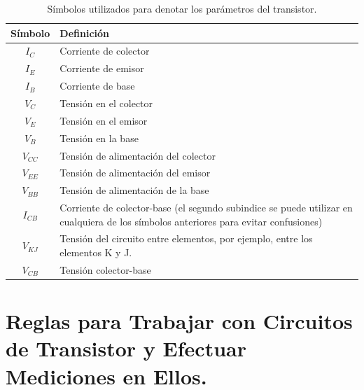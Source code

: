 \documentclass[a4paper,12pt]{article}
\begin{document}
\begin{table}[H]
    \centering
    \begin{tabular}{cp{12cm}}
        \toprule
        Símbolo      & Definición                                                                    \\
        \midrule
        \( I_C \)    & Corriente de colector                                                         \\
        \( I_E \)    & Corriente de emisor                                                           \\
        \( I_B \)    & Corriente de base                                                             \\
        \( V_C \)    & Tensión en el colector                                                        \\
        \( V_E \)    & Tensión en el emisor                                                          \\
        \( V_B \)    & Tensión en la base                                                            \\
        \( V_{CC} \) & Tensión de alimentación del colector                                          \\
        \( V_{EE} \) & Tensión de alimentación del emisor                                            \\
        \(V_{BB} \)  & Tensión de alimentación de la base                                            \\
        \( I_{CB} \) & Corriente de colector-base (el segundo subindice se puede utilizar
        en cualquiera de los símbolos anteriores para evitar confusiones)                            \\
        \(V_{KJ} \)  & Tensión del circuito entre elementos, por ejemplo, entre los elementos K y J. \\
        \(V_{CB} \)  & Tensión colector-base                                                         \\
        \bottomrule
    \end{tabular}
    \caption{Símbolos utilizados para denotar los parámetros del transistor.}
    \label{tab:symbols}
\end{table}

\section{Reglas para Trabajar con Circuitos de Transistor y Efectuar
  Mediciones en Ellos.}
\end{document}
